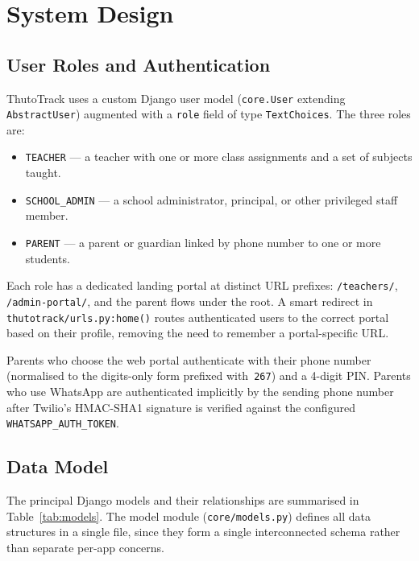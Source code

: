 \documentclass[11pt,a4paper]{article}
\begin{document}
\section{System Design}

\subsection{User Roles and Authentication}

ThutoTrack uses a custom Django user model
(\texttt{core.User} extending \texttt{AbstractUser}) augmented with a
\texttt{role} field of type \texttt{TextChoices}. The three roles are:

\begin{itemize}[leftmargin=*]
    \item \texttt{TEACHER} --- a teacher with one or more class assignments and a
    set of subjects taught.
    \item \texttt{SCHOOL\_ADMIN} --- a school administrator, principal, or other
    privileged staff member.
    \item \texttt{PARENT} --- a parent or guardian linked by phone number to one
    or more students.
\end{itemize}

Each role has a dedicated landing portal at distinct URL prefixes:
\texttt{/teachers/}, \texttt{/admin-portal/}, and the parent flows under the
root. A smart redirect in \texttt{thutotrack/urls.py:home()} routes
authenticated users to the correct portal based on their profile, removing the
need to remember a portal-specific URL.

Parents who choose the web portal authenticate with their phone number
(normalised to the digits-only form prefixed with~\texttt{267}) and a 4-digit
PIN. Parents who use WhatsApp are authenticated implicitly by the sending phone
number after Twilio's HMAC-SHA1 signature is verified against the configured
\texttt{WHATSAPP\_AUTH\_TOKEN}.

\subsection{Data Model}

The principal Django models and their relationships are summarised in
Table~\ref{tab:models}. The model module
(\texttt{core/models.py}) defines all data structures in a single file, since
they form a single interconnected schema rather than separate per-app
concerns.
\end{document}
